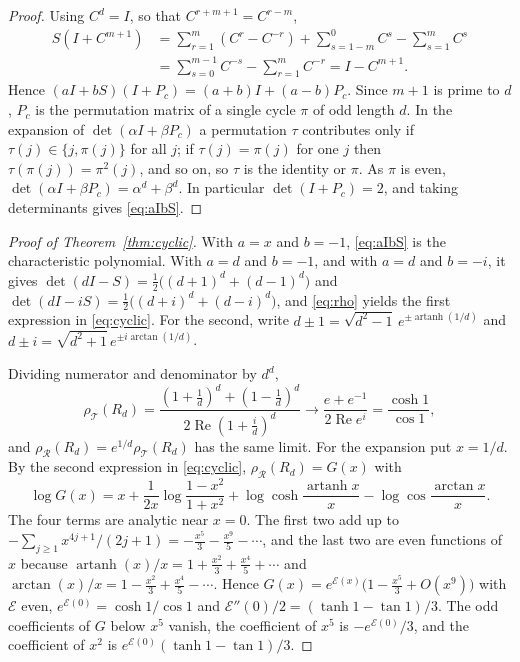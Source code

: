 \documentclass[11pt]{amsart}
\theoremstyle{remark}
\numberwithin{equation}{section}
\newcommand{\artanh}{\operatorname{artanh}}
\newcommand{\cT}{\mathcal{T}}
\newcommand{\cR}{\mathcal{R}}
\begin{document}
\begin{proof}
Using $C^d=I$, so that $C^{r+m+1}=C^{r-m}$,
\begin{align*}
S(I+C^{m+1})&=\sum_{r=1}^m(C^r-C^{-r})+\sum_{s=1-m}^{0}C^{s}-\sum_{s=1}^{m}C^{s}\\
&=\sum_{s=0}^{m-1}C^{-s}-\sum_{r=1}^mC^{-r}=I-C^{m+1}.
\end{align*}
Hence $(aI+bS)(I+P_c)=(a+b)I+(a-b)P_c$. Since $m+1$ is prime to $d$, $P_c$ is the permutation matrix of a single cycle $\pi$ of odd length $d$. In the expansion of $\det(\alpha I+\beta P_c)$ a permutation $\tau$ contributes only if $\tau(j)\in\{j,\pi(j)\}$ for all $j$; if $\tau(j)=\pi(j)$ for one $j$ then $\tau(\pi(j))=\pi^2(j)$, and so on, so $\tau$ is the identity or $\pi$. As $\pi$ is even, $\det(\alpha I+\beta P_c)=\alpha^d+\beta^d$. In particular $\det(I+P_c)=2$, and taking determinants gives \eqref{eq:aIbS}.
\end{proof}

\begin{proof}[Proof of Theorem~\ref{thm:cyclic}]
With $a=x$ and $b=-1$, \eqref{eq:aIbS} is the characteristic polynomial. With $a=d$ and $b=-1$, and with $a=d$ and $b=-i$, it gives $\det(dI-S)=\frac12\bigl((d+1)^d+(d-1)^d\bigr)$ and $\det(dI-iS)=\frac12\bigl((d+i)^d+(d-i)^d\bigr)$, and \eqref{eq:rho} yields the first expression in \eqref{eq:cyclic}. For the second, write $d\pm1=\sqrt{d^2-1}\,e^{\pm\artanh(1/d)}$ and $d\pm i=\sqrt{d^2+1}\,e^{\pm i\arctan(1/d)}$.

Dividing numerator and denominator by $d^d$,
\[
\rho_\cT(R_d)=\frac{(1+\frac1d)^d+(1-\frac1d)^d}{2\operatorname{Re}(1+\frac id)^d}\longrightarrow\frac{e+e^{-1}}{2\operatorname{Re}e^{i}}=\frac{\cosh1}{\cos1},
\]
and $\rho_\cR(R_d)=e^{1/d}\rho_\cT(R_d)$ has the same limit. For the expansion put $x=1/d$. By the second expression in \eqref{eq:cyclic}, $\rho_\cR(R_d)=G(x)$ with
\[
\log G(x)=x+\frac1{2x}\log\frac{1-x^2}{1+x^2}+\log\cosh\frac{\artanh x}{x}-\log\cos\frac{\arctan x}{x}.
\]
The four terms are analytic near $x=0$. The first two add up to $-\sum_{j\ge1}x^{4j+1}/(2j+1)=-\frac{x^5}{3}-\frac{x^9}{5}-\cdots$, and the last two are even functions of $x$ because $\artanh(x)/x=1+\frac{x^2}3+\frac{x^4}5+\cdots$ and $\arctan(x)/x=1-\frac{x^2}3+\frac{x^4}5-\cdots$. Hence $G(x)=e^{\mathcal E(x)}\bigl(1-\frac{x^5}{3}+O(x^9)\bigr)$ with $\mathcal E$ even, $e^{\mathcal E(0)}=\cosh1/\cos1$ and $\mathcal E''(0)/2=(\tanh1-\tan1)/3$. The odd coefficients of $G$ below $x^5$ vanish, the coefficient of $x^5$ is $-e^{\mathcal E(0)}/3$, and the coefficient of $x^2$ is $e^{\mathcal E(0)}(\tanh1-\tan1)/3$.
\end{proof}
\end{document}
